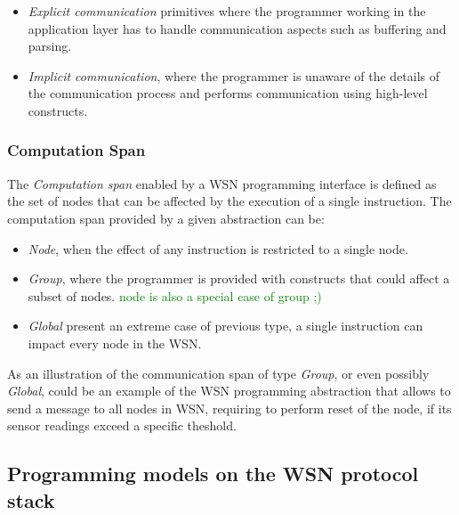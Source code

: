 \begin{itemize}
  \item \emph{Explicit communication} primitives where the
  programmer working in the application layer has to handle communication
  aspects such as buffering and parsing.
  \item \emph{Implicit communication}, where the programmer is unaware of the
  details of the communication process and performs communication using
  high-level constructs.
\end{itemize}

\subsubsection{Computation Span}

The \emph{Computation span} enabled by a WSN programming interface is defined
as the set of nodes that can be affected by the execution of a single
instruction. The
computation span provided by a given abstraction can be:

\begin{itemize}
  \item \emph{Node}, when the effect of any instruction is restricted to a
  single node.
  \item \emph{Group}, where the programmer is provided with constructs that
  could affect a subset of nodes. \textcolor{green}{node is also a special case
  of group ;)}
  \item \emph{Global} present an extreme case of previous type, a single
  instruction can impact every node in the WSN.
\end{itemize}

 As an illustration of the communication span of type \emph{Group}, or even
 possibly \emph{Global}, could be an example of the WSN programming abstraction
 that allows to send a message to all nodes in WSN, requiring to perform reset of the node, if
 its sensor readings exceed a specific theshold.

\subsection{Programming models on the WSN protocol stack}

